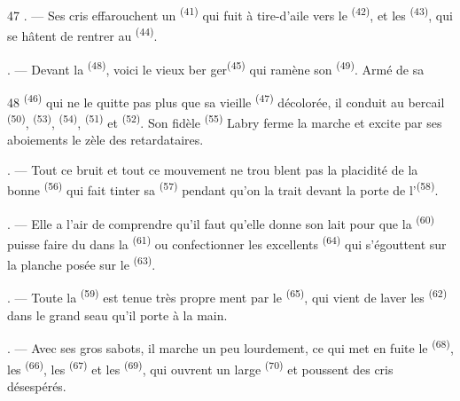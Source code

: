 \begin{VUpage}[49]{47}
. --- Ses cris effarouchent un \textsuperscript{(41)} qui fuit à\nl
tire-d'aile vers le \textsuperscript{(42)}, et les \textsuperscript{(43)},\nl
qui se hâtent de rentrer au \textsuperscript{(44)}.

. --- Devant la \textsuperscript{(48)}, voici le vieux ber\cc
ger\textsuperscript{(45)} qui ramène son \textsuperscript{(49)}. Armé de sa
\parplein
\end{VUpage}

\begin{VUpage}[50]{48}
\VUcontinue
{}\textsuperscript{(46)} qui ne le quitte pas plus que sa vieille\nl
{}\textsuperscript{(47)} décolorée, il conduit au bercail \cc
{}\textsuperscript{(50)}, \textsuperscript{(53)}, \textsuperscript{(54)}, \textsuperscript{(51)} et\nl
{}\textsuperscript{(52)}. Son fidèle \textsuperscript{(55)} Labry ferme\nl
la marche et excite par ses aboiements le zèle des\nl
retardataires.

. --- Tout ce bruit et tout ce mouvement ne trou\cc
blent pas la placidité de la bonne \textsuperscript{(56)}\nl
qui fait tinter sa \textsuperscript{(57)} pendant qu'on la trait\nl
devant la porte de l'\textsuperscript{(58)}.

. --- Elle a l'air de comprendre qu'il faut qu'elle\nl
donne son lait pour que la \textsuperscript{(60)} puisse faire\nl
du  dans la \textsuperscript{(61)} ou confectionner les\nl
excellents \textsuperscript{(64)} qui s'égouttent sur la\nl
planche posée sur le \textsuperscript{(63)}.

. --- Toute la \textsuperscript{(59)} est tenue très propre\cc
ment par le \textsuperscript{(65)}, qui vient de laver\nl
les \textsuperscript{(62)} dans le grand seau qu'il porte à\nl
la main.

. --- Avec ses gros sabots, il marche un peu\nl
lourdement, ce qui met en fuite le \textsuperscript{(68)}, les\nl
{}\textsuperscript{(66)}, les \textsuperscript{(67)} et les \textsuperscript{(69)}, qui ouvrent\nl
un large \textsuperscript{(70)} et poussent des cris désespérés.


\end{VUpage}
